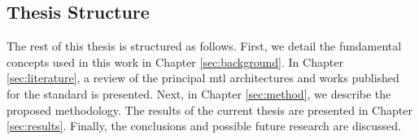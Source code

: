 \subsection{Thesis Structure}
 
The rest of this thesis is structured as follows. First, we detail the fundamental concepts used in this work in Chapter \ref{sec:background}. In Chapter \ref{sec:literature}, a review of the principal \acl{mtl} architectures and works published for the \icao standard is presented. Next, in Chapter \ref{sec:method}, we describe the proposed methodology. The results of the current thesis are presented in Chapter \ref{sec:results}. Finally, the conclusions and possible future research are discussed.
 